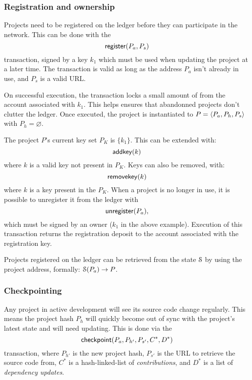 \subsubsection{Registration and ownership} Projects need to be
registered on the ledger before they can participate in the
network. This can be done with the
\[
    \mathsf{register}\small{\lparen P_a, P_s\rparen}
\]
transaction, signed by a key $k_1$ which must be used when updating the project
at a later time. The transaction is valid as long as the address $P_a$ isn't
already in use, and $P_s$ is a valid URL.

On successful execution, the transaction locks a small amount of \oscoin{} from
the account associated with $k_1$. This helps ensures that abandonned projects
don't clutter the ledger.  Once executed, the project is instantiated to $P =
\langle P_a, P_h, P_s\rangle$ with $P_h = \varnothing$.

The project $P$'s current key set $P_K$ is $\{k_1\}$. This can be extended
with:
\[
    \mathsf{addkey}\small{\lparen k\rparen}
\]
where $k$ is a valid key not present in $P_K$. Keys can also be removed, with:
\[
    \mathsf{removekey}\small{\lparen k\rparen}
\]
where $k$ is a key present in the $P_K$.
When a project is no longer in use, it is possible to unregister it from the
ledger with
\[
    \mathsf{unregister}\small{\lparen P_a\rparen},
\]
which must be signed by an owner ($k_1$ in the above example).
Execution of this transaction returns the registration deposit to the account
associated with the registration key.

Projects registered on the ledger can be retrieved from the state $\mathcal{S}$ by
using the project address, formally: $\mathcal{S}(P_a) \to P$.

\subsubsection{Checkpointing} Any project in active development will see its
source code change regularly. This means the project hash $P_h$ will quickly
become out of sync with the project's latest state and will need updating. This
is done via the
\[
    \mathsf{checkpoint}\small{\lparen P_a, P_{h'}, P_{s'}, C^*, D^*\rparen}
\]
transaction, where $P_{h'}$ is the new project hash, $P_{s'}$ is the URL to
retrieve the source code from, $C^*$ is a hash-linked-list of
\emph{contributions}, and $D^*$ is a list of \emph{dependency updates}.

